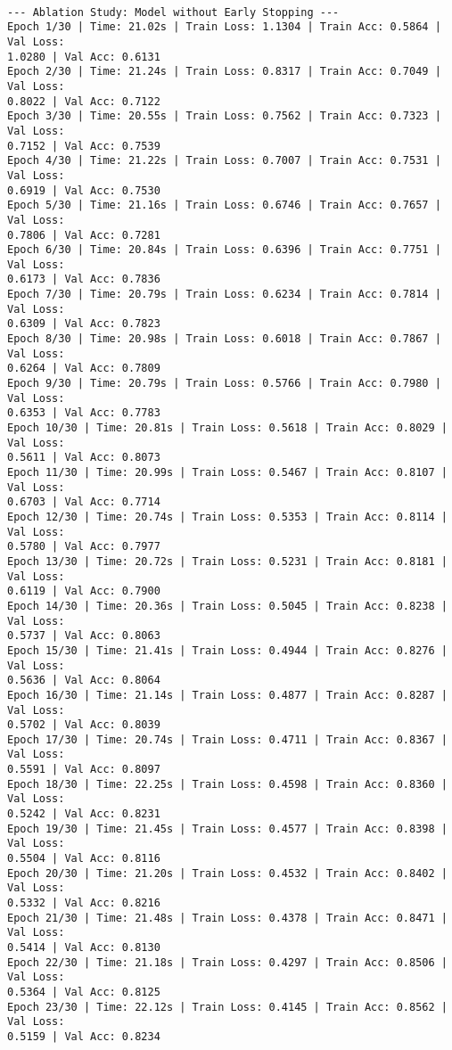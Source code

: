 \documentclass[11pt]{article}
\begin{document}
    \begin{Verbatim}[commandchars=\\\{\}]

--- Ablation Study: Model without Early Stopping ---
Epoch 1/30 | Time: 21.02s | Train Loss: 1.1304 | Train Acc: 0.5864 | Val Loss:
1.0280 | Val Acc: 0.6131
Epoch 2/30 | Time: 21.24s | Train Loss: 0.8317 | Train Acc: 0.7049 | Val Loss:
0.8022 | Val Acc: 0.7122
Epoch 3/30 | Time: 20.55s | Train Loss: 0.7562 | Train Acc: 0.7323 | Val Loss:
0.7152 | Val Acc: 0.7539
Epoch 4/30 | Time: 21.22s | Train Loss: 0.7007 | Train Acc: 0.7531 | Val Loss:
0.6919 | Val Acc: 0.7530
Epoch 5/30 | Time: 21.16s | Train Loss: 0.6746 | Train Acc: 0.7657 | Val Loss:
0.7806 | Val Acc: 0.7281
Epoch 6/30 | Time: 20.84s | Train Loss: 0.6396 | Train Acc: 0.7751 | Val Loss:
0.6173 | Val Acc: 0.7836
Epoch 7/30 | Time: 20.79s | Train Loss: 0.6234 | Train Acc: 0.7814 | Val Loss:
0.6309 | Val Acc: 0.7823
Epoch 8/30 | Time: 20.98s | Train Loss: 0.6018 | Train Acc: 0.7867 | Val Loss:
0.6264 | Val Acc: 0.7809
Epoch 9/30 | Time: 20.79s | Train Loss: 0.5766 | Train Acc: 0.7980 | Val Loss:
0.6353 | Val Acc: 0.7783
Epoch 10/30 | Time: 20.81s | Train Loss: 0.5618 | Train Acc: 0.8029 | Val Loss:
0.5611 | Val Acc: 0.8073
Epoch 11/30 | Time: 20.99s | Train Loss: 0.5467 | Train Acc: 0.8107 | Val Loss:
0.6703 | Val Acc: 0.7714
Epoch 12/30 | Time: 20.74s | Train Loss: 0.5353 | Train Acc: 0.8114 | Val Loss:
0.5780 | Val Acc: 0.7977
Epoch 13/30 | Time: 20.72s | Train Loss: 0.5231 | Train Acc: 0.8181 | Val Loss:
0.6119 | Val Acc: 0.7900
Epoch 14/30 | Time: 20.36s | Train Loss: 0.5045 | Train Acc: 0.8238 | Val Loss:
0.5737 | Val Acc: 0.8063
Epoch 15/30 | Time: 21.41s | Train Loss: 0.4944 | Train Acc: 0.8276 | Val Loss:
0.5636 | Val Acc: 0.8064
Epoch 16/30 | Time: 21.14s | Train Loss: 0.4877 | Train Acc: 0.8287 | Val Loss:
0.5702 | Val Acc: 0.8039
Epoch 17/30 | Time: 20.74s | Train Loss: 0.4711 | Train Acc: 0.8367 | Val Loss:
0.5591 | Val Acc: 0.8097
Epoch 18/30 | Time: 22.25s | Train Loss: 0.4598 | Train Acc: 0.8360 | Val Loss:
0.5242 | Val Acc: 0.8231
Epoch 19/30 | Time: 21.45s | Train Loss: 0.4577 | Train Acc: 0.8398 | Val Loss:
0.5504 | Val Acc: 0.8116
Epoch 20/30 | Time: 21.20s | Train Loss: 0.4532 | Train Acc: 0.8402 | Val Loss:
0.5332 | Val Acc: 0.8216
Epoch 21/30 | Time: 21.48s | Train Loss: 0.4378 | Train Acc: 0.8471 | Val Loss:
0.5414 | Val Acc: 0.8130
Epoch 22/30 | Time: 21.18s | Train Loss: 0.4297 | Train Acc: 0.8506 | Val Loss:
0.5364 | Val Acc: 0.8125
Epoch 23/30 | Time: 22.12s | Train Loss: 0.4145 | Train Acc: 0.8562 | Val Loss:
0.5159 | Val Acc: 0.8234

\end{Verbatim}
\end{document}
